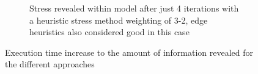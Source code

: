 \begin{figure}[H]
\begin{subfigure}{.5\textwidth}
  \caption{Stress revealed within model after just 4 iterations with a heuristic stress method weighting of 3-2, edge heuristics also considered good in this case}
  \label{fig:sub2}
\end{subfigure}
\label{fig:test}
  \caption{Execution time increase to the amount of information revealed for the different approaches}
 \end{figure}







